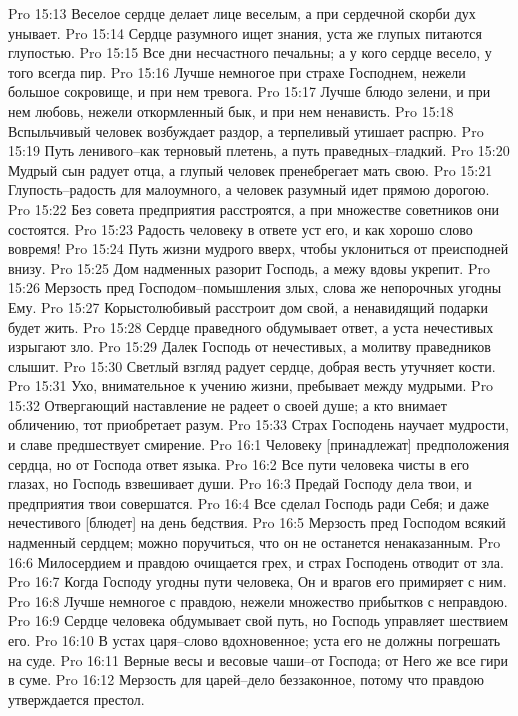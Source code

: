 Pro 15:13  Веселое сердце делает лице веселым, а при сердечной скорби дух унывает.
Pro 15:14  Сердце разумного ищет знания, уста же глупых питаются глупостью.
Pro 15:15  Все дни несчастного печальны; а у кого сердце весело, у того всегда пир.
Pro 15:16  Лучше немногое при страхе Господнем, нежели большое сокровище, и при нем тревога.
Pro 15:17  Лучше блюдо зелени, и при нем любовь, нежели откормленный бык, и при нем ненависть.
Pro 15:18  Вспыльчивый человек возбуждает раздор, а терпеливый утишает распрю.
Pro 15:19  Путь ленивого--как терновый плетень, а путь праведных--гладкий.
Pro 15:20  Мудрый сын радует отца, а глупый человек пренебрегает мать свою.
Pro 15:21  Глупость--радость для малоумного, а человек разумный идет прямою дорогою.
Pro 15:22  Без совета предприятия расстроятся, а при множестве советников они состоятся.
Pro 15:23  Радость человеку в ответе уст его, и как хорошо слово вовремя!
Pro 15:24  Путь жизни мудрого вверх, чтобы уклониться от преисподней внизу.
Pro 15:25  Дом надменных разорит Господь, а межу вдовы укрепит.
Pro 15:26  Мерзость пред Господом--помышления злых, слова же непорочных угодны Ему.
Pro 15:27  Корыстолюбивый расстроит дом свой, а ненавидящий подарки будет жить.
Pro 15:28  Сердце праведного обдумывает ответ, а уста нечестивых изрыгают зло.
Pro 15:29  Далек Господь от нечестивых, а молитву праведников слышит.
Pro 15:30  Светлый взгляд радует сердце, добрая весть утучняет кости.
Pro 15:31  Ухо, внимательное к учению жизни, пребывает между мудрыми.
Pro 15:32  Отвергающий наставление не радеет о своей душе; а кто внимает обличению, тот приобретает разум.
Pro 15:33  Страх Господень научает мудрости, и славе предшествует смирение.
Pro 16:1  Человеку [принадлежат] предположения сердца, но от Господа ответ языка.
Pro 16:2  Все пути человека чисты в его глазах, но Господь взвешивает души.
Pro 16:3  Предай Господу дела твои, и предприятия твои совершатся.
Pro 16:4  Все сделал Господь ради Себя; и даже нечестивого [блюдет] на день бедствия.
Pro 16:5  Мерзость пред Господом всякий надменный сердцем; можно поручиться, что он не останется ненаказанным.
Pro 16:6  Милосердием и правдою очищается грех, и страх Господень отводит от зла.
Pro 16:7  Когда Господу угодны пути человека, Он и врагов его примиряет с ним.
Pro 16:8  Лучше немногое с правдою, нежели множество прибытков с неправдою.
Pro 16:9  Сердце человека обдумывает свой путь, но Господь управляет шествием его.
Pro 16:10  В устах царя--слово вдохновенное; уста его не должны погрешать на суде.
Pro 16:11  Верные весы и весовые чаши--от Господа; от Него же все гири в суме.
Pro 16:12  Мерзость для царей--дело беззаконное, потому что правдою утверждается престол.
